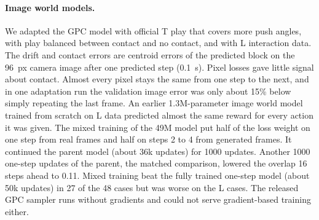 \documentclass[10pt,twocolumn,letterpaper]{article}
\begin{document}
\paragraph{Image world models.}
We adapted the GPC model with official T play that covers more push angles, with play balanced between contact and
no contact, and with L interaction data. The drift and contact errors are centroid errors of the predicted block on the
96~px camera image after one predicted step (0.1~s). Pixel losses gave little signal about contact. Almost every pixel
stays the same from one step to the next, and in one adaptation run the validation image error was only about 15\%
below simply repeating the last frame. An earlier 1.3M-parameter image world model trained from scratch on L data
predicted almost the same reward for every action it was given. The mixed training of the 49M model put half of the
loss weight on one step from real frames and half on steps 2 to 4 from generated frames. It continued the parent model
(about 36k updates) for 1000 updates. Another 1000 one-step updates of the parent, the matched comparison, lowered the
overlap 16 steps ahead to 0.11. Mixed training beat the fully trained one-step model (about 50k updates) in 27 of the
48 cases but was worse on the L cases. The released GPC sampler runs without gradients
and could not serve gradient-based training either.
\end{document}
